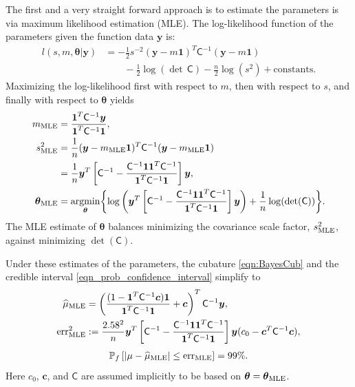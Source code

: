 \documentclass{iitthesis}          %
\newcommand{\bm}[1]{\boldsymbol{#1}}
\newcommand{\vtheta}{{\bm{\theta}}}
\newcommand{\vc}{\bm{c}}
\newcommand{\vy}{\bm{y}}
\newcommand{\vone}{\bm{1}}
\newcommand{\mC}{\mathsf{C}}
\newcommand{\mCInv}{{\mathsf{C}^{-1}}}
\newcommand{\hmu}{\widehat{\mu}}
\newcommand{\MLE}{\textup{MLE}}
\newcommand{\err}{\textup{err}}
\providecommand{\argmin}{\operatorname*{argmin}}
\begin{document}
  \label{sec:MLE}
The first and a very straight forward approach is to estimate the parameters is via maximum likelihood estimation (MLE).  The log-likelihood function of the parameters given the function data $\vy$ is:
\begin{align*}
l(s,m,\vtheta | \vy)
&= -\frac{1}{2} s^{-2} (\vy-m\vone)^T\mCInv(\vy-m\vone) 
\\ & \qquad
 - \frac{1}{2} \log(\det\, \mC) - \frac{n}{2} \log(s^2) + \text{constants.}
\end{align*}
Maximizing the log-likelihood first with respect to $m$, then with respect to $s$, and finally with respect to $\vtheta$ yields
\begin{align}
\label{eqn_m_MLE}
m_\MLE &= \frac{\vone^T \mCInv \vy }{ \vone^T \mCInv \vone}, \\
\nonumber
s^2_{\MLE}  
&= \frac{1}{n} (\vy-m_{\MLE}\vone)^T\mCInv(\vy-m_{\MLE}\vone) 
\\
\label{eqn_s2_MLE}
&= 
\frac{1}{n}
\vy^T 
\left[ 
\mCInv - 
\frac{ \mCInv \vone \vone^T \mCInv }{\vone^T\mCInv \vone}
\right] \vy, \\
\label{eqn:thetaMLE} 
\vtheta_\MLE
&= \argmin_{\vtheta} \biggl \{
\log\left(\vy^T 
\left[ \mCInv - 
\frac{ \mCInv \vone \vone^T \mCInv }{\vone^T\mCInv \vone}
\right] \vy 
\right)  +  \frac{1}{n} \log(\det(\mC))
\biggr \}.
\end{align}
The MLE estimate of $\vtheta$ balances minimizing the covariance scale factor, $s^2_{\MLE}$, against minimizing  $\det(\mC)$. 

Under these estimates of the parameters, the cubature \eqref{eqn:BayesCub} and the credible interval \eqref{eqn_prob_confidence_interval} simplify to 
\begin{align} \label{eqn:cubMLE}
\hmu_\MLE  &= 
\left(
\frac{ (1 - \vone^T  \mCInv\vc )  \vone }{ \vone^T \mCInv \vone}   +  \vc 
\right)^T  \mCInv \vy, \\
\label{eqn:errMLE} 
\err_\MLE^2 & : = \frac{2.58^2}{n}
 \vy^T \left[ \mCInv - 
\frac{ \mCInv \vone \vone^T \mCInv }{\vone^T\mCInv \vone}
\right] \vy  
(c_0 - \vc^T\mC^{-1}\vc ),
\end{align}
\begin{align}
\label{eqn_prob_CI_MLE}
\mathbb{P}_f \left[
|\mu-\hmu_\MLE| \leq \err_\MLE \right]  = 99\%.
\end{align}
Here $c_0$, $\vc$, and $\mC$ are assumed implicitly to be based on $\vtheta = \vtheta_\MLE$.   
\end{document}
